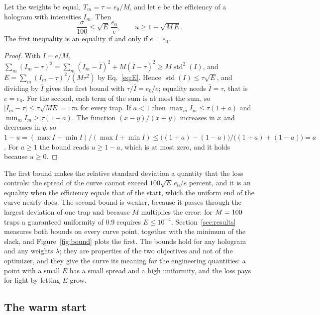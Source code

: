 \begin{proposition}\label{prop:bound}
Let the weights be equal, $T_m=\tau=e_0/M$, and let $e$ be the efficiency of a hologram with intensities $I_m$. Then
\begin{equation}
\frac{\sigma}{100}\le\sqrt{E}\,\frac{e_0}{e},\qquad u\ge1-\sqrt{M\,E}.\label{eq:bounds}
\end{equation}
The first inequality is an equality if and only if $e=e_0$.
\end{proposition}
\begin{proof}
With $\bar I=e/M$, $\sum_m(I_m-\tau)^2=\sum_m(I_m-\bar I)^2+M(\bar I-\tau)^2\ge M\operatorname{std}^2(I)$, and $E=\sum_m(I_m-\tau)^2/(M\tau^2)$ by Eq.~\ref{eq:E}. Hence $\operatorname{std}(I)\le\tau\sqrt E$, and dividing by $\bar I$ gives the first bound with $\tau/\bar I=e_0/e$; equality needs $\bar I=\tau$, that is $e=e_0$.
For the second, each term of the sum is at most the sum, so $|I_m-\tau|\le\tau\sqrt{ME}=:\tau a$ for every trap. If $a<1$ then $\max_mI_m\le\tau(1+a)$ and $\min_mI_m\ge\tau(1-a)$. The function $(x-y)/(x+y)$ increases in $x$ and decreases in $y$, so $1-u=(\max I-\min I)/(\max I+\min I)\le\big((1+a)-(1-a)\big)/\big((1+a)+(1-a)\big)=a$. For $a\ge1$ the bound reads $u\ge1-a$, which is at most zero, and it holds because $u\ge0$.
\end{proof}

The first bound makes the relative standard deviation a quantity that the loss controls: the spread of the curve cannot exceed $100\sqrt E\,e_0/e$ percent, and it is an equality when the efficiency equals that of the start, which the uniform end of the curve nearly does. The second bound is weaker, because it passes through the largest deviation of one trap and because $M$ multiplies the error: for $M=100$ traps a
guaranteed uniformity of 0.9 requires $E\le10^{-4}$. Section~\ref{sec:results} measures both bounds on every curve point, together with the minimum of the slack, and Figure~\ref{fig:bound} plots the first. The bounds hold for any hologram and any weights $\lambda$; they are properties of the two objectives and not of the optimizer, and they give the curve its meaning
for the engineering quantities: a point with a small $E$ has a small spread and a high uniformity, and the loss pays for light by letting $E$ grow.

\subsection{The warm start}

